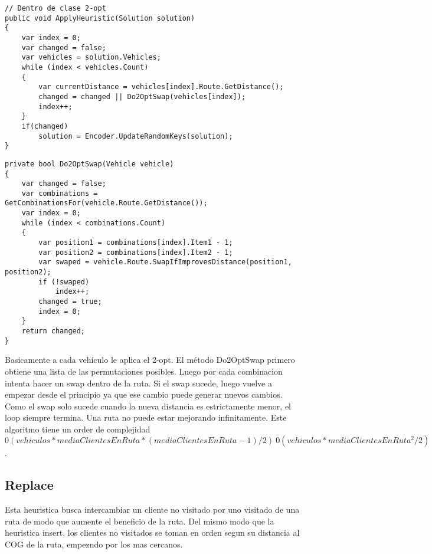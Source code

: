 \begin{minipage}{\textwidth}
\begin{lstlisting}
// Dentro de clase 2-opt
public void ApplyHeuristic(Solution solution)
{
	var index = 0;
	var changed = false;	
	var vehicles = solution.Vehicles;	
	while (index < vehicles.Count)
	{
		var currentDistance = vehicles[index].Route.GetDistance();
		changed = changed || Do2OptSwap(vehicles[index]);
		index++;
	}
	if(changed)
		solution = Encoder.UpdateRandomKeys(solution);
}
\end{lstlisting}
\end{minipage}

\begin{minipage}{\textwidth}
\begin{lstlisting}
private bool Do2OptSwap(Vehicle vehicle)
{
	var changed = false;	
	var combinations = GetCombinationsFor(vehicle.Route.GetDistance());
	var index = 0;
	while (index < combinations.Count)
	{
		var position1 = combinations[index].Item1 - 1;
		var position2 = combinations[index].Item2 - 1;
		var swaped = vehicle.Route.SwapIfImprovesDistance(position1, position2);
		if (!swaped)
			index++;
		changed = true;
		index = 0;
	}
	return changed;
}
\end{lstlisting}
\end{minipage}

\bigskip

Basicamente a cada vehículo le aplica el 2-opt. El método Do2OptSwap primero obtiene una lista de las permutaciones posibles. Luego por cada combinacion intenta hacer un swap dentro de la ruta. Si el swap sucede, luego vuelve a empezar desde el principio ya que ese cambio puede generar nuevos cambios. Como el swap solo sucede cuando la nueva distancia es estrictamente menor, el loop siempre termina. Una ruta no puede estar mejorando infinitamente. Este algoritmo tiene un order de complejidad $0(vehiculos * mediaClientesEnRuta  * (mediaClientesEnRuta - 1) / 2) ~ 0 (vehiculos * mediaClientesEnRuta^2 / 2)$.

\subsection{Replace}

Esta heuristica busca intercambiar un cliente no visitado por uno visitado de una ruta de modo que aumente el beneficio de la ruta. Del mismo modo que la heuristica insert, los clientes no visitados se toman en orden segun su distancia al COG de la ruta, empezndo por los mas cercanos.

